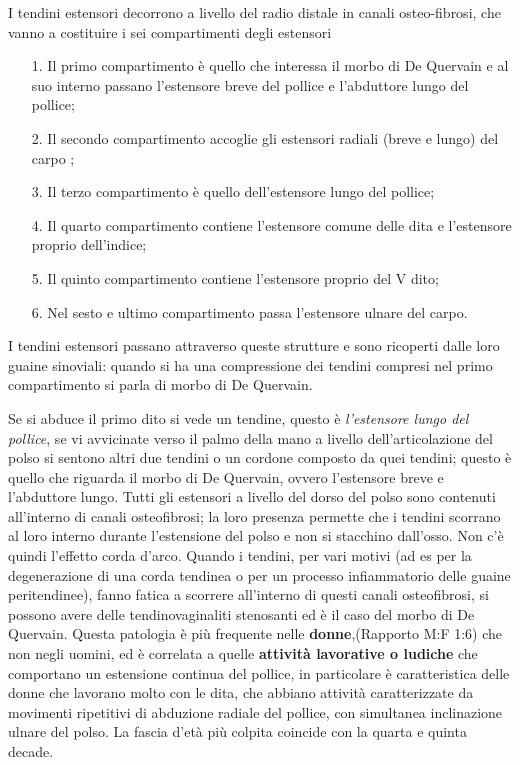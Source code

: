 I tendini estensori decorrono a livello del radio distale in canali osteo-fibrosi, che vanno a costituire i sei compartimenti degli estensori

\begin{itemize}
\item[1.]
  Il primo compartimento è quello che interessa il morbo di De Quervain e al suo interno passano l'estensore breve del pollice e l'abduttore lungo del pollice;
\item[2.]
  Il secondo compartimento accoglie gli estensori radiali (breve e lungo) del carpo ;
\item[3.]
  Il terzo compartimento è quello dell'estensore lungo del pollice;
\item[4.]
  Il quarto compartimento contiene l'estensore comune delle dita e l'estensore proprio dell'indice;
\item[5.]
  Il quinto compartimento contiene l'estensore proprio del V dito;
\item[6.]
  Nel sesto e ultimo compartimento passa l'estensore ulnare del carpo.
\end{itemize}

I tendini estensori passano attraverso queste strutture e sono ricoperti dalle loro guaine sinoviali: quando si ha una compressione dei tendini
compresi nel primo compartimento si parla di morbo di De Quervain.

Se si abduce il primo dito si vede un tendine, questo è \emph{l'estensore lungo del pollice}, se vi avvicinate verso il palmo della mano a livello dell'articolazione del polso si sentono altri due
tendini o un cordone composto da quei tendini; questo è quello che riguarda il morbo di De Quervain, ovvero l'estensore breve e l'abduttore
lungo. Tutti gli estensori a livello del dorso del polso sono contenuti all'interno di canali osteofibrosi; la loro presenza permette che i
tendini scorrano al loro interno durante l'estensione del polso e non si stacchino dall'osso. Non c'è quindi l'effetto corda d'arco. Quando i
tendini, per vari motivi (ad es per la degenerazione di una corda tendinea o per un processo infiammatorio delle guaine peritendinee), fanno fatica a scorrere all'interno di questi canali osteofibrosi, si possono avere delle tendinovaginaliti stenosanti ed è il caso del morbo
di De Quervain. Questa patologia è più frequente nelle \textbf{donne},(Rapporto M:F 1:6) che non negli uomini, ed è correlata a quelle  \textbf{attività lavorative o ludiche} che comportano un estensione continua del pollice, in particolare è caratteristica delle donne che
lavorano molto con le dita, che abbiano attività caratterizzate da movimenti ripetitivi di abduzione radiale del pollice, con simultanea inclinazione ulnare del polso. La fascia d'età più colpita coincide con la quarta e quinta decade.

